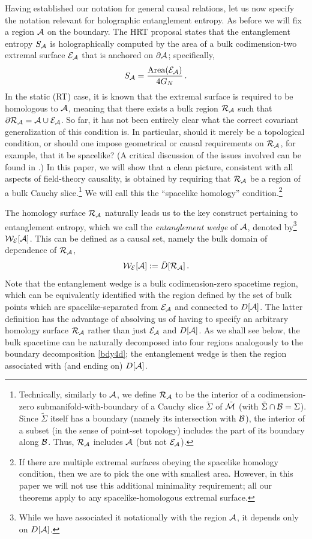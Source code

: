 \documentclass[12pt]{article}
\def\bulkD{{\tilde D}}
\def\bulk{{\cal M}}
\def\bdy{{\cal B}}
\def\overM{\tilde \bulk}
\def\regA{{\cal A}}
\def\entsurf{
\partial \regA}
\def\domdA{D[\regA]}
\def\extr{{\cal E}_\regA}
\def\homsurfA{{\cal R}_{\regA}}
\def\EWA{{\cal W}_{\cal E}[\regA]}
\begin{document}
Having established our notation for general causal relations, let us now specify the notation relevant for holographic entanglement entropy. As before we will fix a region $\regA$ on the boundary. The HRT proposal \cite{Hubeny:2007xt} states that the entanglement entropy $S_\regA$ is holographically computed  by the area of a bulk codimension-two extremal surface $\extr$ that is anchored on $\entsurf$; specifically,
%
\begin{equation}
S_\regA = \frac{\text{Area}(\extr)}{4 G_N}\,.
\label{SAdef}
\end{equation}	
%
In the static (RT) case, it is known that the extremal surface is required to be homologous to $\regA$, meaning that there exists a bulk region $\homsurfA$ such that $\partial\homsurfA=\regA\cup\extr$. So far, it has not been entirely clear what the correct covariant generalization of this condition is. In particular, should it merely be a topological condition, or should one impose geometrical or causal requirements on $\homsurfA$, for example, that it be spacelike? (A critical discussion of the issues involved can be found in \cite{Hubeny:2013gta}.) In this paper, we will show that a clean picture, consistent with all aspects of field-theory causality, is obtained by requiring that $\homsurfA$ be a region of a bulk Cauchy slice.\footnote{ Technically, similarly to $\regA$, we define $\homsurfA$ to be the interior of a codimension-zero submanifold-with-boundary of a Cauchy slice $\tilde\Sigma$ of $\overM$ (with $\tilde\Sigma\cap\bdy=\Sigma$). Since $\tilde\Sigma$ itself has a boundary (namely its intersection with $\bdy$), the interior of a subset (in the sense of point-set topology) includes the part of its boundary along $\bdy$. Thus, $\homsurfA$ includes $\regA$ (but not $\extr$).}  We will call this the ``spacelike homology'' condition.\footnote{ If there are multiple extremal surfaces obeying the spacelike homology condition, then we are to pick the one with smallest area. However, in this paper we will not use this additional minimality requirement; all our theorems apply to any spacelike-homologous extremal surface.}

The homology surface $\homsurfA$ naturally leads us to the key construct pertaining to entanglement entropy,  which we call the {\em entanglement wedge} of $\regA$, denoted
by\footnote{ While we have associated it notationally with the region $\regA$, it depends only on $D[\regA]$. } $\EWA$. This can be defined as a causal set, namely the bulk domain of dependence of $\homsurfA$,
%
\begin{equation}
\EWA  := \bulkD[\homsurfA]\,.
\label{ewedge}
\end{equation}	
%
Note that the entanglement wedge is a bulk codimension-zero spacetime region, which can be equivalently identified with the region defined by the set of bulk points which are spacelike-separated from $\extr$ and connected to $\domdA$.  The latter definition has the advantage of absolving us of having to specify an arbitrary  homology surface $\homsurfA$ rather than just $\extr$ and $\domdA$.
As we shall see below, the bulk spacetime can be naturally decomposed into four regions analogously to the boundary decomposition \eqref{bdy4d}; the entanglement wedge is then the region associated with (and ending on) $\domdA$.
\end{document}
